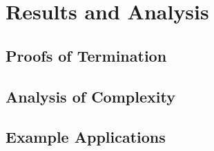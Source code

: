 \documentclass[thesis.tex]{subfiles}
\begin{document}
\chapter{Results and Analysis}
\label{chap:results-and-analysis}


\section{Proofs of Termination}



\section{Analysis of Complexity}


\section{Example Applications}
\end{document}
